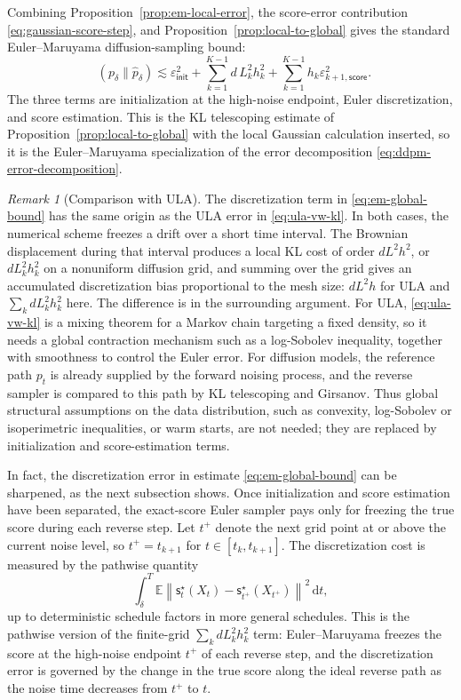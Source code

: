 \documentclass{amsart}
\numberwithin{equation}{section}
\theoremstyle{plain}
\theoremstyle{definition}
\theoremstyle{remark}
\newtheorem*{remark}{Remark}
\DeclareMathOperator{\KL}{D_{\mathsf{KL}}}
\newcommand{\E}{\mathbb{E}}
\newcommand{\dd}{\,\mathrm{d}}
\newcommand{\wh}[1]{\widehat{#1}}
\newcommand{\eps}{\varepsilon}
\newcommand{\norm}[1]{\left\lVert #1 \right\rVert}
\newcommand{\sstar}{\mathsf{s}^{\star}}
\newcommand{\epsinit}{\varepsilon_{\mathsf{init}}}
\begin{document}
Combining Proposition~\ref{prop:em-local-error}, the score-error contribution
\eqref{eq:gaussian-score-step}, and Proposition~\ref{prop:local-to-global}
gives the standard Euler--Maruyama diffusion-sampling bound:
\begin{equation}\label{eq:em-global-bound}
    \KL(p_\delta\|\wh p_\delta)
    \lesssim
    \epsinit^2
    +
    \sum_{k=1}^{K-1} d\,L_k^2h_k^2
    +
    \sum_{k=1}^{K-1}
    h_k\eps_{k+1,\mathsf{score}}^2.
\end{equation}
The three terms are initialization at the high-noise endpoint, Euler
discretization, and score estimation.  This is the KL telescoping estimate of
Proposition~\ref{prop:local-to-global} with the local Gaussian calculation
inserted, so it is the Euler--Maruyama specialization of the error decomposition
\eqref{eq:ddpm-error-decomposition}.

\begin{remark}[Comparison with ULA]
The discretization term in \eqref{eq:em-global-bound} has the same origin as
the ULA error in \eqref{eq:ula-vw-kl}.  In both cases, the numerical scheme
freezes a drift over a short time interval.  The Brownian displacement during
that interval produces a local KL cost of order $dL^2h^2$, or $dL_k^2h_k^2$ on
a nonuniform diffusion grid, and summing over the grid gives an accumulated
discretization bias proportional to the mesh size: $dL^2h$ for ULA and
$\sum_k dL_k^2h_k^2$ here.  The difference is in the surrounding argument.  For
ULA, \eqref{eq:ula-vw-kl} is a mixing theorem for a Markov chain targeting a
fixed density, so it needs a global contraction mechanism such as a log-Sobolev
inequality, together with smoothness to control the Euler error.  For diffusion
models, the reference path $p_t$ is already supplied by the forward noising
process, and the reverse sampler is compared to this path by KL telescoping and
Girsanov.  Thus global structural assumptions on the data distribution, such as
convexity, log-Sobolev or isoperimetric inequalities, or warm starts, are not
needed; they are replaced by initialization and score-estimation terms.
\end{remark}

In fact, the discretization error in estimate \eqref{eq:em-global-bound} can be sharpened, as the next subsection shows.  Once
initialization and score estimation have been separated, the exact-score Euler
sampler pays only for freezing the true score
during each reverse step.  Let $t^+$ denote the next grid point at or above the
current noise level, so $t^+=t_{k+1}$ for $t\in[t_k,t_{k+1}]$.  The
discretization cost is measured by the pathwise quantity
\begin{equation}\label{eq:cll-bottleneck}
    \int_\delta^T
    \E\norm{
        \sstar_t(X_t)-\sstar_{t^+}(X_{t^+})
    }^2\dd t,
\end{equation}
up to deterministic schedule factors in more general schedules.  This is the
pathwise version of the finite-grid $\sum_k dL_k^2h_k^2$ term:
Euler--Maruyama freezes the score at the high-noise endpoint $t^+$ of each
reverse step, and the discretization error is governed by the change in the
true score along the ideal reverse path as the noise time decreases from
$t^+$ to $t$.
\end{document}
